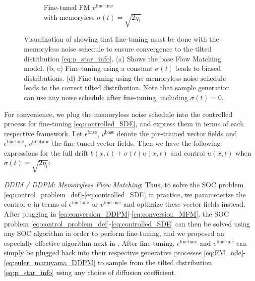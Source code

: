 \documentclass[]{fairmeta}
\begin{document}
\begin{figure}
\begin{subfigure}[t]{0.25\linewidth}
        \caption{Fine-tuned FM $v^\mathrm{finetune}$\\ with memoryless $\sigma(t) = \sqrt{2\eta_t}$}
    \end{subfigure}
    \caption{Visualization of  showing that fine-tuning must be done with the memoryless noise schedule to ensure convergence to the tilted distribution \eqref{eq:p_star_info}. (a) Shows the base Flow Matching model. (b, c) Fine-tuning using a constant $\sigma(t)$ leads to biased distributions. (d) Fine-tuning using the memoryless noise schedule leads to the correct tilted distribution. Note that sample generation can use any noise schedule after fine-tuning, including $\sigma(t) = 0$.}
    \label{fig:memorylessness_illustration}
\end{figure}

For convenience, we plug the memoryless noise schedule into the controlled process for fine-tuning \eqref{eq:controlled_SDE}, and express them in terms of each respective framework.
Let $\epsilon^{\mathrm{base}}$, $v^{\mathrm{base}}$ denote the pre-trained vector fields and $\epsilon^{\mathrm{finetune}}$, $v^{\mathrm{finetune}}$ the fine-tuned vector fields. Then we have the following expressions for the full drift $b(x,t) + \sigma(t) u(x,t)$ and control $u(x,t)$ when $\sigma(t) = \sqrt{2\eta_t}$:

\quad \textit{DDIM / DDPM}:
\vspace{0.4em}
\quad \textit{Memoryless Flow Matching}:
Thus, to solve the SOC problem \eqref{eq:control_problem_def}-\eqref{eq:controlled_SDE} in practice, we parameterize the control $u$ in terms of $\epsilon^{\mathrm{finetune}}$ or $v^{\mathrm{finetune}}$ and optimize these vector fields instead. After plugging in \eqref{eq:conversion_DDPM}-\eqref{eq:conversion_MFM}, the SOC problem \eqref{eq:control_problem_def}-\eqref{eq:controlled_SDE} can then be solved using any SOC algorithm in order to perform fine-tuning, and we proposed an especially effective algorithm next in . After fine-tuning, $\epsilon^{\mathrm{finetune}}$ and $v^{\mathrm{finetune}}$ can simply be plugged back into their respective generative processes \eqref{eq:FM_ode}-\eqref{eq:euler_maruyama_DDPM} to sample from the tilted distribution \eqref{eq:p_star_info} using any choice of diffusion coefficient. 
\end{document}

